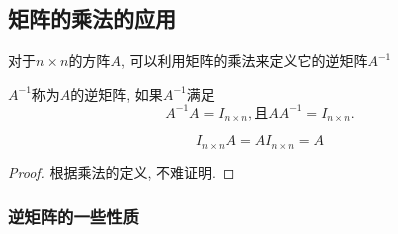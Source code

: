 
\subsection{矩阵的乘法的应用}

对于$n \times n$的方阵$A$, 可以利用矩阵的乘法来定义它的逆矩阵$A^{-1}$
\begin{definition}
    $A^{-1}$称为$A$的逆矩阵, 如果$A^{-1}$满足
    \begin{equation}
      A^{-1} A = I_{n \times n}, \text{且} A A^{-1} = I_{n \times n}.
    \end{equation}
\end{definition}

\begin{proposition}
    \begin{equation}
      I_{n \times n} A = A I_{n \times n} = A
    \end{equation}
\end{proposition}
\begin{proof}
    根据乘法的定义, 不难证明. 
\end{proof}

\subsubsection{逆矩阵的一些性质}

